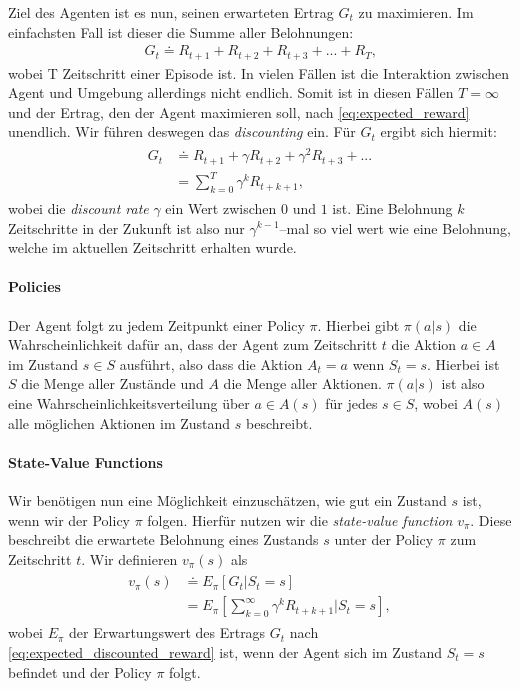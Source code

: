 Ziel des Agenten ist es nun, seinen erwarteten Ertrag $ G_t $ zu maximieren. Im einfachsten Fall ist dieser die Summe aller Belohnungen:
\begin{align}
    G_t \doteq R_{t + 1} + R_{t + 2} + R_{t + 3} + ... + R_T \text{,} \label{eq:expected_reward}
\end{align}
wobei T Zeitschritt einer Episode ist. In vielen Fällen ist die Interaktion zwischen Agent und Umgebung allerdings nicht endlich. Somit ist in diesen Fällen $ T = \infty $ und der Ertrag, den der Agent maximieren soll, nach \ref{eq:expected_reward} unendlich. Wir führen deswegen das \textit{discounting} ein. Für $ G_t $ ergibt sich hiermit:
\begin{align}
    \begin{split}
        G_t & \doteq R_{t + 1} + \gamma R_{t + 2} + \gamma^2 R_{t + 3} + ...\\
        & = \sum_{k = 0}^{T} \gamma^k R_{t + k + 1} \text{,}
    \end{split} \label{eq:expected_discounted_reward}
\end{align}
wobei die \textit{discount rate} $ \gamma $ ein Wert zwischen $ 0 $ und $ 1 $ ist. Eine Belohnung $ k $ Zeitschritte in der Zukunft ist also nur $ \gamma^{k - 1} $--mal so viel wert wie eine Belohnung, welche im aktuellen Zeitschritt erhalten wurde.

\paragraph{Policies}
Der Agent folgt zu jedem Zeitpunkt einer Policy $ \pi $. Hierbei gibt $ \pi(a|s) $ die Wahrscheinlichkeit dafür an, dass der Agent zum Zeitschritt $ t $ die Aktion $ a \in A $ im Zustand $ s \in S $ ausführt, also dass die Aktion $ A_t = a $ wenn $ S_t = s $. Hierbei ist $ S $ die Menge aller Zustände und $ A $ die Menge aller Aktionen. $ \pi(a|s) $ ist also eine Wahrscheinlichkeitsverteilung über $ a \in A(s) $ für jedes $ s \in S $, wobei $ A(s) $ alle möglichen Aktionen im Zustand $ s $ beschreibt.

\paragraph{State-Value Functions}
Wir benötigen nun eine Möglichkeit einzuschätzen, wie gut ein Zustand $ s $ ist, wenn wir der Policy $ \pi $ folgen. Hierfür nutzen wir die \textit{state-value function} $ v_\pi $. Diese beschreibt die erwartete Belohnung eines Zustands $ s $ unter der Policy $ \pi $ zum Zeitschritt $ t $. Wir definieren $ v_\pi(s) $ als
\begin{align}
    \begin{split}
    v_\pi(s) & \doteq E_\pi \left[G_t | S_t = s \right]\\
    & = E_\pi \left[\sum_{k = 0}^{\infty} \gamma^k R_{t + k + 1} | S_t = s \right],
    \end{split}
\end{align}
wobei $ E_\pi $ der Erwartungswert des Ertrags $ G_t $ nach \ref{eq:expected_discounted_reward} ist, wenn der Agent sich im Zustand $ S_t = s $ befindet und der Policy $ \pi $ folgt.

